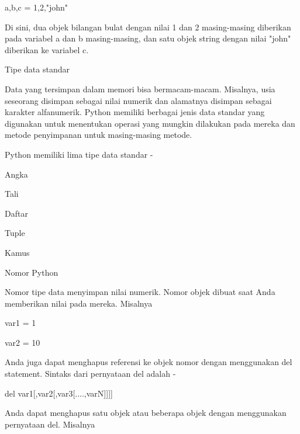 \vspace{12pt}
\noindent 
a,b,c = 1,2,"john" \par
\vspace{12pt}
\noindent 
Di sini, dua objek bilangan bulat dengan nilai 1 dan 2 masing-masing diberikan pada variabel a dan b masing-masing, dan satu objek string dengan nilai "john" diberikan ke variabel c. \par
\vspace{12pt}
\noindent 
Tipe data standar \par
\noindent 
Data yang tersimpan dalam memori bisa bermacam-macam. $  $Misalnya, usia seseorang disimpan sebagai nilai numerik dan alamatnya disimpan sebagai karakter alfanumerik. $  $Python memiliki berbagai jenis data standar yang digunakan untuk menentukan operasi yang mungkin dilakukan pada mereka dan metode penyimpanan untuk masing-masing metode. \par
\vspace{12pt}
\noindent 
Python memiliki lima tipe data standar - \par
\vspace{12pt}
\noindent 
Angka \par
\noindent 
Tali \par
\noindent 
Daftar \par
\noindent 
Tuple \par
\noindent 
Kamus \par
\noindent 
Nomor Python \par
\vspace{12pt}
\noindent 
Nomor tipe data menyimpan nilai numerik. $  $Nomor objek dibuat saat Anda memberikan nilai pada mereka. $  $Misalnya  \par
\vspace{12pt}
\noindent 
var1 = 1 \par
\noindent 
var2 = 10 \par
\vspace{12pt}
\noindent 
Anda juga dapat menghapus referensi ke objek nomor dengan menggunakan del statement. $  $Sintaks dari pernyataan del adalah - \par
\vspace{12pt}
\noindent 
del var1[,var2[,var3[....,varN]]]] \par
\vspace{12pt}
\noindent 
Anda dapat menghapus satu objek atau beberapa objek dengan menggunakan pernyataan del. $  $Misalnya  \par
\vspace{12pt}
\noindent 
